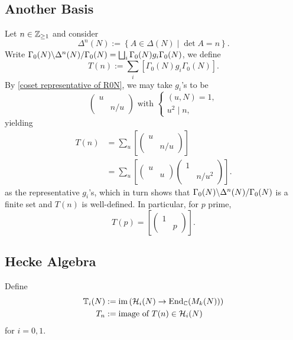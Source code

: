 \subsection{Another Basis}
\begin{definition}
    [operator $T(n)$]
    Let $n\in\Z_{\ge 1}$ and consider \[\Delta^n(N) := \left\{ A\in\Delta(N)\mid \det A = n \right\}.\]
    Write $\bico{\Delta^n(N )}{\Gamma_0(N)}{\Gamma_0(N)} = \bigsqcup_{i} \Gamma_0(N)g_i\Gamma_0(N)$, we define \[T(n) := \sum_{i} [\Gamma_0(N)g_i\Gamma_0(N)].\]
    By \cref{coset representative of R0N}, we may take $g_i$'s to be \[\begin{pmatrix}
        u & \\ & n/u
    \end{pmatrix}\text{  with }\begin{cases}
        (u, N) = 1,\\ u^2\mid n,
    \end{cases}\]yielding\begin{align*}
        T(n) &= \sum_{u} \left[ \begin{pmatrix}
            u & \\ & n/u
        \end{pmatrix} \right]\\ 
        &=\sum_{u} \left[ \begin{pmatrix}
            u & \\ & u
        \end{pmatrix}\begin{pmatrix}
            1 & \\ & n/u^2
        \end{pmatrix} \right].
    \end{align*}
    as the representative $g_i$'s, which in turn shows that $\bico{\Delta^n(N )}{\Gamma_0(N)}{\Gamma_0(N)}$ is a finite set and $T(n)$ is well-defined.
    In particular, for $p$ prime, \[T(p) = \left[ \begin{pmatrix}
        1&\\ &p
    \end{pmatrix} \right].\]
\end{definition}

\subsection{Hecke Algebra}
Define \begin{align}
    \mathbb{T}_i(N) &:= \im \left( \hecke_i(N)\to \enom_{\C} (M_k(N))\right)\\
    T_n &:= \text{image of } T(n)\in\hecke_i(N)
 \end{align}
for $i = 0, 1$.





